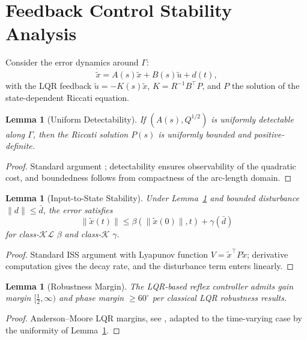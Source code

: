 \documentclass[11pt,twocolumn]{article}
\newtheorem{lemma}[theorem]{Lemma}
\theoremstyle{definition}
\theoremstyle{remark}
\providecommand{\cK}{\mathcal{K}}
\providecommand{\cL}{\mathcal{L}}
\begin{document}
\section{Feedback Control Stability Analysis}
\label{app:stability}

Consider the error dynamics around $\Gamma$:
\begin{equation}
\dot{\tilde x} = A(s)\tilde x + B(s)\tilde u + d(t),
\end{equation}
with the LQR feedback $\tilde u = -K(s)\tilde x$, $K = R^{-1}B^{\top}P$, and $P$ the solution of the state-dependent Riccati equation.

\begin{lemma}[Uniform Detectability]\label{lem:detect}
If $(A(s), Q^{1/2})$ is uniformly detectable along $\Gamma$, then the Riccati solution $P(s)$ is uniformly bounded and positive-definite.
\end{lemma}

\begin{proof}
Standard argument \cite{bryson1975applied,kirk2012optimal}; detectability ensures observability of the quadratic cost, and boundedness follows from compactness of the arc-length domain.
\end{proof}

\begin{lemma}[Input-to-State Stability]\label{lem:iss}
Under Lemma~\ref{lem:detect} and bounded disturbance $\|d\| \le \bar d$, the error satisfies
\begin{equation}
\|\tilde x(t)\| \le \beta(\|\tilde x(0)\|, t) + \gamma(\bar d)
\end{equation}
for class-$\cK\cL$ $\beta$ and class-$\cK$ $\gamma$.
\end{lemma}

\begin{proof}
Standard ISS argument with Lyapunov function $V = \tilde x^{\top} P \tilde x$; derivative computation gives the decay rate, and the disturbance term enters linearly.
\end{proof}

\begin{lemma}[Robustness Margin]\label{lem:robust}
The LQR-based reflex controller admits gain margin $[\tfrac{1}{2}, \infty)$ and phase margin $\ge 60^{\circ}$ per classical LQR robustness results.
\end{lemma}

\begin{proof}
Anderson--Moore LQR margins, see \cite{anderson1971linear}, adapted to the time-varying case by the uniformity of Lemma~\ref{lem:detect}.
\end{proof}
\end{document}
